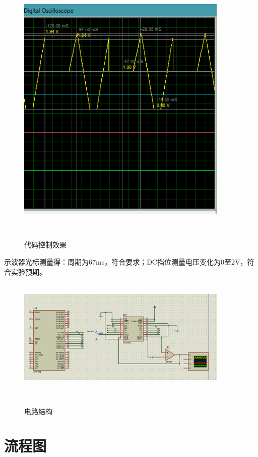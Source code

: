 \documentclass[12pt,hyperref,a4paper,UTF8]{ctexart}
\begin{document}
\begin{figure}[H] %
    \centering
    \includegraphics[width=0.9\textwidth]{figures/201.png} %
    \caption{代码控制效果} %
    \label{fig:example} %
\end{figure}
示波器光标测量得：周期为67ms，符合要求；DC挡位测量电压变化为0至2V，符合实验预期。
\begin{figure}[H] %
    \centering
    \includegraphics[width=0.9\textwidth]{figures/202.png} %
    \caption{电路结构} %
    \label{fig:example} %
\end{figure}

\section{流程图}
\end{document}
